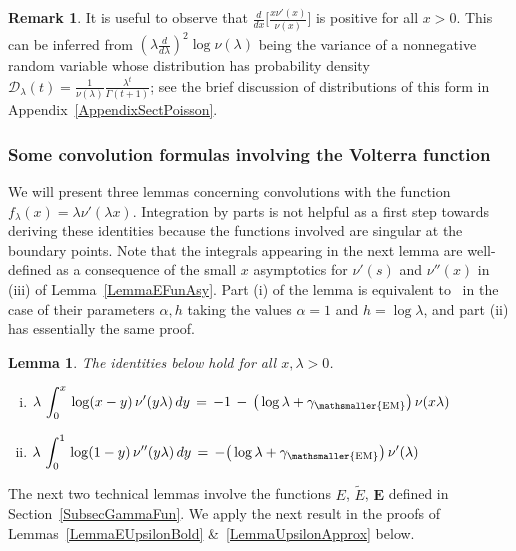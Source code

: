 \documentclass[10pt]{article}
\numberwithin{equation}{section}
\newtheorem{lemma}[theorem]{Lemma}
\theoremstyle{definition}
\newtheorem{remark}[theorem]{Remark}
\begin{document}
\begin{remark}\label{Remark2nd} It is useful to observe that $\frac{d}{dx}\big[\frac{x\nu'(x)  }{\nu(x)  }   \big] $ is positive for all $x>0$. This can be inferred from   $(\lambda\frac{d}{d\lambda})^2\log \nu(\lambda)  $ being the variance of a nonnegative random variable whose distribution has probability density $\mathcal{D}_{\lambda}(t)= \frac{ 1 }{ \nu(\lambda)  }\frac{ \lambda^{t}  }{\Gamma(t+1) } $; see the brief discussion  of distributions of this form in Appendix~\ref{AppendixSectPoisson}.
\end{remark}

\subsubsection{Some convolution formulas involving the Volterra function}

We will present three lemmas concerning convolutions with the function $f_{\lambda}(x)=\lambda \nu'(\lambda x)$.  Integration by parts is not helpful as a first step towards deriving these identities because  the functions involved are singular at the boundary points.  Note that the integrals appearing in the next lemma are well-defined as a consequence of the small $x$ asymptotics for $\nu'(s)$ and $\nu''(x)$ in (iii) of  Lemma~\ref{LemmaEFunAsy}.  Part (i) of the lemma  is equivalent to~\cite[Lem.\ 32.1]{SKM} in the case of their parameters $\alpha, h$ taking the values $\alpha=1$ and $h=\log\lambda$, and part (ii) has essentially the same proof.
\begin{lemma}\label{LemmaELog} The identities below hold for all $x,\lambda>0$.
\begin{enumerate}[(i)]
\item   $\displaystyle \lambda\, \int_0^{x}\,\log(x-y) \,\nu'( y\lambda)\,dy\,=\, -1\, -\,\big(\log\lambda +\gamma_{\mathsmaller{\textup{EM}}}\big)\, \nu( x\lambda ) $
\item  $\displaystyle \lambda\, \int_0^{1} \,\log(1-y)\,\nu''( y \lambda)\,dy\,=\,  -\big(\log\lambda+\gamma_{\mathsmaller{\textup{EM}}}\big) \,\nu'(\lambda  ) $
\end{enumerate}

\end{lemma}



The next two technical lemmas involve the functions $E$, $\widetilde{E}$, $\mathbf{E}$  defined  in Section~\ref{SubsecGammaFun}.  We apply the next result in the proofs of Lemmas~\ref{LemmaEUpsilonBold} \&~\ref{LemmaUpsilonApprox} below. 
\end{document}
